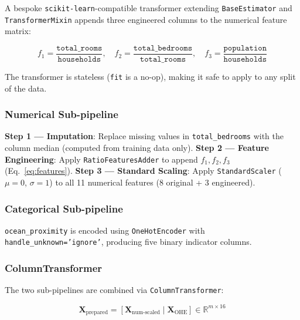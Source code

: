 \documentclass[conference]{IEEEtran}
\begin{document}
A bespoke \texttt{scikit-learn}-compatible transformer extending \texttt{BaseEstimator} and \texttt{TransformerMixin} appends three engineered columns to the numerical feature matrix:

\begin{equation}
    f_1 = \frac{\texttt{total\_rooms}}{\texttt{households}}, \quad
    f_2 = \frac{\texttt{total\_bedrooms}}{\texttt{total\_rooms}}, \quad
    f_3 = \frac{\texttt{population}}{\texttt{households}}
    \label{eq:features}
\end{equation}

The transformer is stateless (\texttt{fit} is a no-op), making it safe to apply to any split of the data.

\subsubsection{Numerical Sub-pipeline}

\begin{algorithm}
\caption{Numerical Feature Preprocessing}
\label{alg:num}
\begin{algorithmic}[1]
\STATE \textbf{Step 1 — Imputation}: Replace missing values in \texttt{total\_bedrooms} with the column median (computed from training data only).
\STATE \textbf{Step 2 — Feature Engineering}: Apply \texttt{RatioFeaturesAdder} to append $f_1, f_2, f_3$ (Eq.~\ref{eq:features}).
\STATE \textbf{Step 3 — Standard Scaling}: Apply \texttt{StandardScaler} ($\mu = 0$, $\sigma = 1$) to all 11 numerical features (8 original + 3 engineered).
\end{algorithmic}
\end{algorithm}

\subsubsection{Categorical Sub-pipeline}

\texttt{ocean\_proximity} is encoded using \texttt{OneHotEncoder} with \texttt{handle\_unknown='ignore'}, producing five binary indicator columns.

\subsubsection{ColumnTransformer}

The two sub-pipelines are combined via \texttt{ColumnTransformer}:

\begin{equation}
    \mathbf{X}_{\text{prepared}} = \left[\mathbf{X}_{\text{num-scaled}} \mid \mathbf{X}_{\text{OHE}}\right] \in \mathbb{R}^{m \times 16}
    \label{eq:prepared}
\end{equation}
\end{document}
